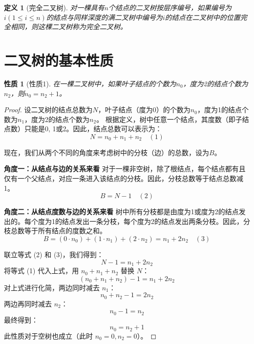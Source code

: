 \documentclass[12pt,a4paper]{amsart}
\newtheorem{definition}{定义}[section]
\newtheorem{property}{性质}[section]
\begin{document}
\begin{definition}[完全二叉树]
对一棵具有$n$个结点的二叉树按层序编号，如果编号为$i(1 \leq i \leq n)$的结点与同样深度的满二叉树中编号为$i$的结点在二叉树中的位置完全相同，则这棵二叉树称为完全二叉树。
\end{definition}

\begin{center}
\end{center}

\section{二叉树的基本性质}

\begin{property}[性质1]
在一棵二叉树中，如果叶子结点的个数为$n_0$，度为2的结点个数为$n_2$，则$n_0 = n_2 + 1$。
\end{property}

\begin{proof}
设二叉树的结点总数为$N$，叶子结点（度为0）的个数为$n_0$，度为1的结点个数为$n_1$，度为2的结点个数为$n_2$。
根据定义，树中任意一个结点，其度数（即子结点数）只能是0, 1或2。因此，结点总数可以表示为：
$$N = n_0 + n_1 + n_2 \quad (1)$$

现在，我们从两个不同的角度来考虑树中的分枝（边）的总数，设为$B$。

\textbf{角度一：从结点与边的关系来看}
对于一棵非空树，除了根结点，每个结点都有且仅有一个父结点，对应一条进入该结点的分枝。因此，分枝总数等于结点总数减1。
$$B = N - 1 \quad (2)$$

\textbf{角度二：从结点度数与边的关系来看}
树中所有分枝都是由度为1或度为2的结点发出的。每个度为1的结点发出一条分枝，每个度为2的结点发出两条分枝。因此，分枝总数等于所有结点的度数之和。
$$B = (0 \cdot n_0) + (1 \cdot n_1) + (2 \cdot n_2) = n_1 + 2n_2 \quad (3)$$

联立等式 (2) 和 (3)，我们得到：
$$N - 1 = n_1 + 2n_2$$
将等式 (1) 代入上式，用 $n_0 + n_1 + n_2$ 替换 $N$：
$$(n_0 + n_1 + n_2) - 1 = n_1 + 2n_2$$
对上式进行化简，两边同时减去 $n_1$：
$$n_0 + n_2 - 1 = 2n_2$$
两边再同时减去 $n_2$：
$$n_0 - 1 = n_2$$
最终得到：
$$n_0 = n_2 + 1$$
此性质对于空树也成立（此时 $n_0=0, n_2=0$）。
\end{proof}
\end{document}
